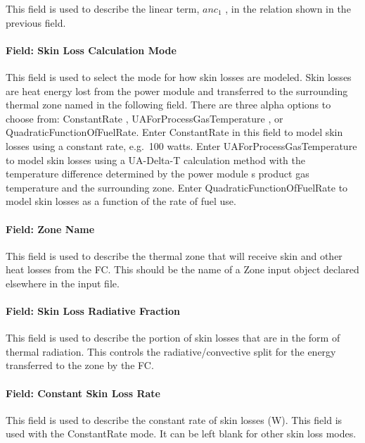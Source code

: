 This field is used to describe the linear term, \(an{c_1}\) , in the relation shown in the previous field.

\paragraph{Field: Skin Loss Calculation Mode}\label{field-skin-loss-calculation-mode}

This field is used to select the mode for how skin losses are modeled. Skin losses are heat energy lost from the power module and transferred to the surrounding thermal zone named in the following field. There are three alpha options to choose from: ConstantRate , UAForProcessGasTemperature , or QuadraticFunctionOfFuelRate. Enter ConstantRate in this field to model skin losses using a constant rate, e.g.~100 watts. Enter UAForProcessGasTemperature to model skin losses using a UA-Delta-T calculation method with the temperature difference determined by the power module s product gas temperature and the surrounding zone. Enter QuadraticFunctionOfFuelRate to model skin losses as a function of the rate of fuel use.

\paragraph{Field: Zone Name}\label{field-zone-name-8-000}

This field is used to describe the thermal zone that will receive skin and other heat losses from the FC. This should be the name of a Zone input object declared elsewhere in the input file.

\paragraph{Field: Skin Loss Radiative Fraction}\label{field-skin-loss-radiative-fraction-1}

This field is used to describe the portion of skin losses that are in the form of thermal radiation. This controls the radiative/convective split for the energy transferred to the zone by the FC.

\paragraph{Field: Constant Skin Loss Rate}\label{field-constant-skin-loss-rate}

This field is used to describe the constant rate of skin losses (W). This field is used with the ConstantRate mode. It can be left blank for other skin loss modes.

